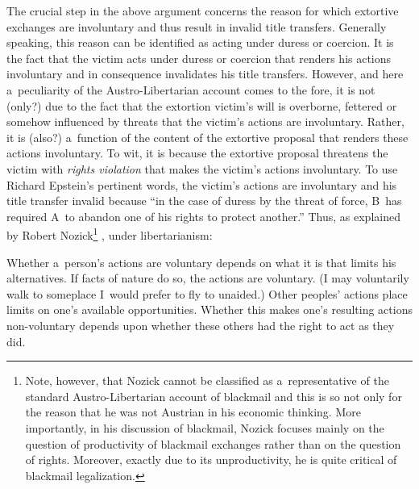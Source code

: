 The crucial step in the above argument concerns the reason for which extortive exchanges are involuntary and thus result in invalid title transfers. Generally speaking, this reason can be identified as acting under duress or coercion. It is the fact that the victim acts under duress or coercion that renders his actions involuntary and in consequence invalidates his title transfers. However, and here a~peculiarity of the Austro-Libertarian account comes to the fore, it is not (only?) due to the fact that the extortion victim's will is overborne, fettered or somehow influenced by threats that the victim's actions are involuntary. Rather, it is (also?) a~function of the content of the extortive proposal that renders these actions involuntary. To wit, it is because the extortive proposal threatens the victim with \textit{rights violation} that makes the victim's actions involuntary. To use Richard Epstein's 
\parencite*[][p.296]{epstein_unconscionability_1975} %
 pertinent words, the victim's actions are involuntary and his title transfer invalid because ``in the case of duress by the threat of force, B~has required A~to abandon one of his rights to protect another.'' Thus, as explained by Robert Nozick\footnote{Note, however, that Nozick cannot be classified as a~representative of the standard Austro-Libertarian account of blackmail and this is so not only for the reason that he was not Austrian in his economic thinking. More importantly, in his discussion of blackmail, Nozick focuses mainly on the question of productivity of blackmail exchanges rather than on the question of rights. Moreover, exactly due to its unproductivity, he is quite critical of blackmail legalization. } 
\parencite*[][p.262]{}, %
 under libertarianism:



Whether a~person's actions are voluntary depends on what it is that limits his alternatives. If facts of nature do so, the actions are voluntary. (I may voluntarily walk to someplace I~would prefer to fly to unaided.) Other peoples' actions place limits on one's available opportunities. Whether this makes one's resulting actions non-voluntary depends upon whether these others had the right to act as they did.



